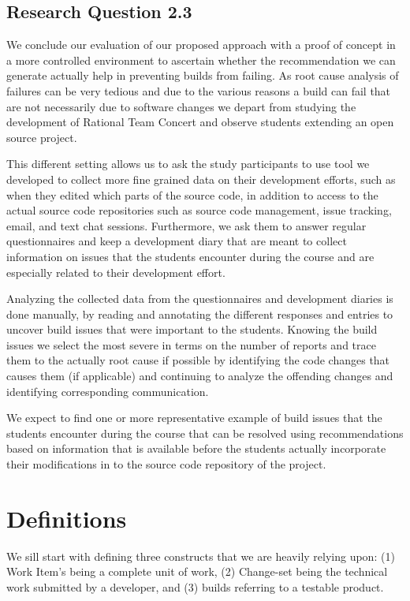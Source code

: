 \subsection{Research Question 2.3}
We conclude our evaluation of our proposed approach with  a proof of concept in a more controlled environment to ascertain whether the recommendation we can generate actually help in preventing builds from failing.
As root cause analysis of failures can be very tedious and due to the various reasons a build can fail that are not necessarily due to software changes we depart from studying the development of Rational Team Concert and observe students extending an open source project.

This different setting allows us to ask the study participants to use tool we developed to collect more fine grained data on their development efforts, such as when they edited which parts of the source code, in addition to access to the actual source code repositories such as source code management, issue tracking, email, and text chat sessions.
Furthermore, we ask them to answer regular questionnaires and keep a development diary that are meant to collect information on issues that the students encounter during the course and are especially related to their development effort.

Analyzing the collected data from the questionnaires and development diaries is done manually, by reading and annotating the different responses and entries to uncover build issues that were important to the students.
Knowing the build issues we select the most severe in terms on the number of reports and trace them to the actually root cause if possible by identifying the code changes that causes them (if applicable) and continuing to analyze the offending changes and identifying corresponding communication.

We expect to find one or more representative example of build issues that the students encounter during the course that can be resolved using recommendations based on information that is available before the students actually incorporate their modifications in to the source code repository of the project.

\section{Definitions}
\label{c5:sec:definitions}
We sill start with defining three constructs that we are heavily relying upon: (1) Work Item's being a complete unit of work, (2) Change-set being the technical work submitted by a developer, and (3) builds referring to a testable product.

